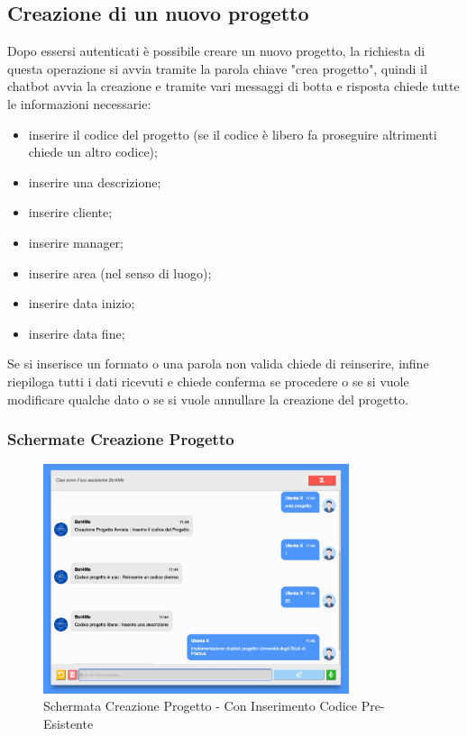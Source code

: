 \subsection{Creazione di un nuovo progetto}
Dopo essersi autenticati è possibile creare un nuovo progetto, la richiesta di questa operazione si avvia tramite la parola chiave "crea progetto", quindi il chatbot avvia la creazione e tramite vari messaggi di botta e risposta chiede tutte le informazioni necessarie:
\begin{itemize}
    \item inserire il codice del progetto (se il codice è libero fa proseguire altrimenti chiede un altro codice);
    \item inserire una descrizione;
    \item inserire cliente;
    \item inserire manager;
    \item inserire area (nel senso di luogo);
    \item inserire data inizio;
    \item inserire data fine;
\end{itemize}
Se si inserisce un formato o una parola non valida chiede di reinserire, infine riepiloga tutti i dati ricevuti e chiede conferma se procedere o se si vuole modificare qualche dato o se si vuole annullare la creazione del progetto.

\subsubsection{Schermate Creazione Progetto}
\begin{figure}[H]
    \centering\includegraphics[width=0.8\textwidth, height=0.7\textheight, keepaspectratio]{images/schermata_creazione_progetto_1.png}
    \caption{Schermata Creazione Progetto - Con Inserimento Codice Pre-Esistente}
\end{figure}

